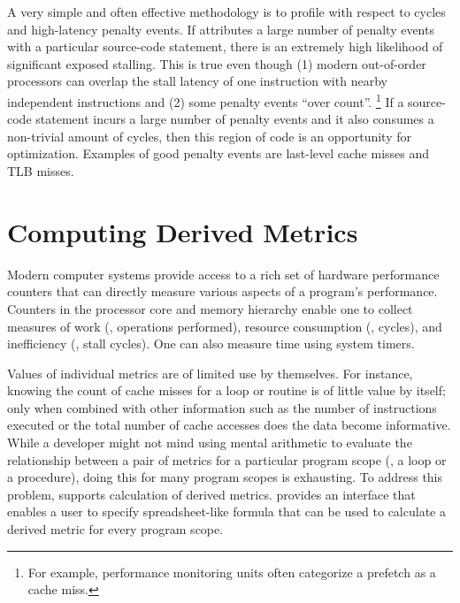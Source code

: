 \documentclass[11pt,letterpaper]{report}
\begin{document}
A very simple and often effective methodology is to profile with respect to cycles and high-latency penalty events.
If \HPCToolkit{} attributes a large number of penalty events with a particular source-code statement, there is an extremely high likelihood of significant exposed stalling.
This is true even though (1) modern out-of-order processors can overlap the stall latency of one instruction with nearby independent instructions and (2) some penalty events ``over count''.%
\footnote{For example, performance monitoring units often categorize a prefetch as a cache miss.}
If a source-code statement incurs a large number of penalty events and it also consumes a non-trivial amount of cycles, then this region of code is an opportunity for optimization.
Examples of good penalty events are last-level cache misses and TLB misses.



\section{Computing Derived Metrics}
\label{sec:effective-performance-analysis:derived-metrics}

Modern computer systems provide access to a rich set of hardware performance counters that can directly measure various aspects of a program's performance.
Counters in the processor core and memory hierarchy enable one to collect measures of work (\eg, operations performed), resource consumption (\eg, cycles), and inefficiency (\eg, stall cycles).
One can also measure time using system timers.

Values of individual metrics are of limited use by themselves.
For instance, knowing the count of cache misses for a loop or routine is of little value by itself; only when combined with other information such as the number of instructions executed or the total number of cache accesses does the data become informative.
While a developer might not mind using mental arithmetic to evaluate the relationship between a pair of metrics for a particular program scope (\eg, a loop or a procedure), doing this for many program scopes is exhausting.
To address this problem, \hpcviewer{} supports calculation of derived metrics.
\hpcviewer{} provides an interface that enables a user to specify spreadsheet-like formula that can be used to calculate a derived metric for every program scope. 
\end{document}
